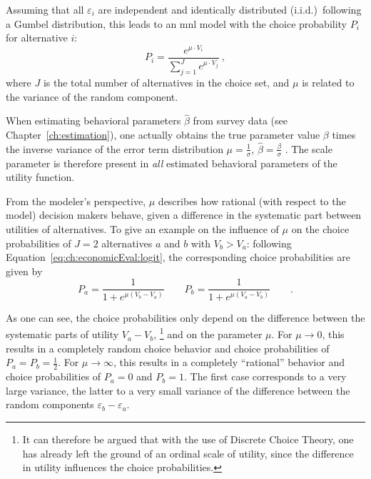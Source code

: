 Assuming that all $\varepsilon_i$ are independent and identically distributed (i.i.d.)\ following a Gumbel distribution, this leads to an \gls{mnl} model with the choice probability $P_i$ for alternative $i$:
%
\begin{equation}
P_{i} = \frac{e^{\mu \cdot V_i}}{\sum_{j=1}^{J} e^{\mu \cdot V_{j}}} \ ,
\label{eq:ch:economicEval:logit}
\end{equation}
%
%
where $J$ is the total number of alternatives in the choice set, and $\mu$ is related to the variance of the random component.%

%
When estimating behavioral parameters $\hat{\beta}$ from survey data (see Chapter~\ref{ch:estimation}), one actually obtains the true parameter value $\beta$ times the inverse variance of the error term distribution $\mu = \frac{1}{\sigma}$, \ie $\hat{\beta} = \frac{\beta}{\sigma}$ \citep[see, e.g.,][p.45, where $\sigma$ is defined as \emph{scale parameter}]{Train2003discreteChoiceBook}. The scale parameter is therefore present in \emph{all} estimated behavioral parameters of the utility function.
%

From the modeler's perspective, $\mu$ describes how rational (with respect to the model) decision makers behave, given a difference in the systematic part between utilities of alternatives. To give an example on the influence of $\mu$ on the choice probabilities of $J=2$ alternatives $a$ and $b$ with $V_b > V_a$: following Equation~\ref{eq:ch:economicEval:logit}, the corresponding choice probabilities are given by
%
\[
P_a = \frac{1}{1 + e^{\mu(V_b - V_a)}} \qquad P_b = \frac{1}{1 + e^{\mu(V_a - V_b)}} \qquad .
\]

%
As one can see, the choice probabilities only depend on the difference between the systematic parts of utility $V_a - V_b$,%
%
\footnote{
%
It can therefore be argued that with the use of Discrete Choice Theory, one has already left the ground of an ordinal scale of utility, since the difference in utility influences the choice probabilities.
%
}
%
and on the parameter $\mu$.
%
For $\mu \to 0$, this results in a completely random choice behavior and choice probabilities of $P_a = P_b = \frac{1}{2}$.
%
For $\mu \to \infty$, this results in a completely ``rational'' behavior and choice probabilities of $P_a = 0$ and $P_b = 1$.
%
The first case corresponds to a very large variance, the latter to a very small variance of the difference between the random components $\varepsilon_b - \varepsilon_a$.

